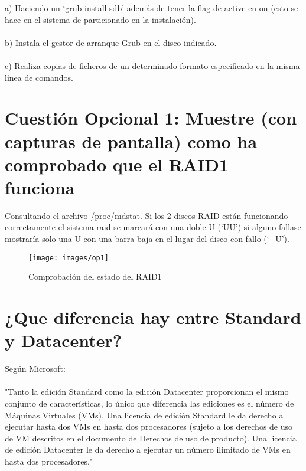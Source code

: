 a) Haciendo un ‘grub-install sdb’ además de tener la flag de active en on (esto se hace en el sistema de particionado en la instalación).\\\\
b) Instala el gestor de arranque Grub en el disco indicado.\\\\
c) Realiza copias de ficheros de un determinado formato especificado en la misma línea de comandos.
\clearpage
\section{Cuestión Opcional 1: Muestre (con capturas de pantalla) como ha comprobado que el RAID1 funciona}

Consultando el archivo /proc/mdstat. Si los 2 discos RAID están funcionando correctamente el sistema raid se marcará con una doble U (‘UU’) si alguno fallase mostraría solo una U con una barra baja en el lugar del disco con fallo (‘\_U’).\\
\begin{figure}[H]
	\centering
	\texttt{[image: images/op1]}
	\caption{Comprobación del estado del RAID1}
	\label{fig:co101}
\end{figure}
\section{¿Que diferencia hay entre Standard y Datacenter? \cite{12p141}}

Según Microsoft:\\\\
"Tanto la edición Standard como la edición Datacenter proporcionan el mismo conjunto de características, lo único que diferencia las ediciones es el número de Máquinas Virtuales (VMs). Una licencia de edición Standard le da derecho a ejecutar hasta dos VMs en hasta dos procesadores (sujeto a los derechos de uso de VM descritos en el documento de Derechos de uso de producto). Una licencia de edición Datacenter le da derecho a ejecutar un número ilimitado de VMs en hasta dos procesadores."\\

